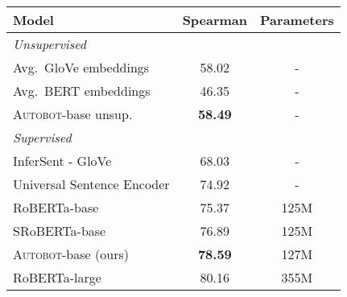 

\begin{table}[t]
	\centering 
	\footnotesize
	\renewcommand{\arraystretch}{1.3}
	\begin{tabular}{l | c | c}
		\toprule
		\textbf{Model} & \textbf{Spearman} & \textbf{Parameters} \\ \midrule
		\multicolumn{3}{l}{\textit{Unsupervised}} \\\midrule
		Avg.\ GloVe embeddings & 58.02 & - \\
		Avg.\ BERT embeddings &  46.35 & - \\
		\textsc{Autobot}-base unsup. & \textbf{58.49} & - \\\midrule
		\multicolumn{3}{l}{\textit{Supervised}} \\\midrule
		InferSent - GloVe &  68.03 & - \\
		Universal Sentence Encoder &  74.92 & - \\

        RoBERTa-base & 75.37 & 125M\\
		SRoBERTa-base & 76.89 & 125M \\
		\textsc{Autobot}-base (ours) & \textbf{78.59} & 127M \\\hline
        RoBERTa-large & 80.16 & 355M \\
		 

\end{tabular}
\end{table}
